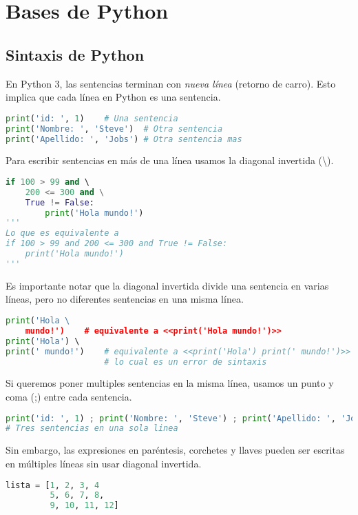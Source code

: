 \section{Bases de Python}
	\subsection{Sintaxis de Python}\label{subsec: sintaxis}
	En Python 3, las sentencias terminan con \emph{nueva línea} (retorno de carro). Esto implica que cada línea en Python es una sentencia. 
	\begin{lstlisting}[language={python}]
print('id: ', 1)    # Una sentencia
print('Nombre: ', 'Steve')  # Otra sentencia
print('Apellido: ', 'Jobs') # Otra sentencia mas
	\end{lstlisting}
	Para escribir sentencias en más de una línea usamos la diagonal invertida (\textbackslash).
	\begin{lstlisting}[language={python}]
if 100 > 99 and \ 
    200 <= 300 and \
    True != False:
        print('Hola mundo!')
'''
Lo que es equivalente a
if 100 > 99 and 200 <= 300 and True != False:
    print('Hola mundo!')
'''
	\end{lstlisting}
    Es importante notar que la diagonal invertida divide una sentencia en varias líneas, pero no diferentes sentencias en una misma línea.
    \begin{lstlisting}[language={python}]
print('Hola \ 
    mundo!')    # equivalente a <<print('Hola mundo!')>>
print('Hola') \ 
print(' mundo!')    # equivalente a <<print('Hola') print(' mundo!')>>
                    # lo cual es un error de sintaxis
    \end{lstlisting}
    Si queremos poner multiples sentencias en la misma línea, usamos un punto y coma (;) entre cada sentencia.
    \begin{lstlisting}[language={python}]
print('id: ', 1) ; print('Nombre: ', 'Steve') ; print('Apellido: ', 'Jobs') 
# Tres sentencias en una sola linea
    \end{lstlisting}
    Sin embargo, las expresiones en paréntesis, corchetes y llaves pueden ser escritas en múltiples líneas sin usar diagonal invertida.
    \begin{lstlisting}[language={python}]
lista = [1, 2, 3, 4
         5, 6, 7, 8,
         9, 10, 11, 12]
    \end{lstlisting}
